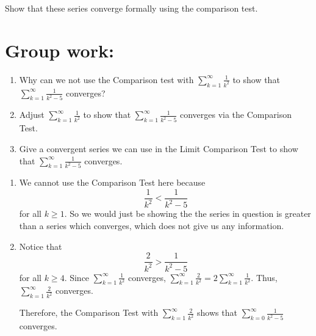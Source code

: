 \documentclass[noinstructornotes]{ximera}
\begin{document}
\begin{instructorNotes}
Show that these series converge formally using the comparison test.
\end{instructorNotes}







\section{Group work:}



\begin{problem}
	\begin{enumerate}
	
	\item  Why can we not use the Comparison test with $\sum_{k=1}^\infty \frac{1}{k^2}$ to show that $\sum_{k=1}^\infty \frac{1}{k^2 - 5}$ converges?
	
	\item  Adjust $\sum_{k=1}^\infty \frac{1}{k^2}$ to show that $\sum_{k=1}^\infty \frac{1}{k^2 - 5}$ converges via the Comparison Test.
	
	\item  Give a convergent series we can use in the Limit Comparison Test to show that $\sum_{k=1}^\infty \frac{1}{k^2 - 5}$ converges.  
	
	\end{enumerate}
	
	\begin{freeResponse}
		\begin{enumerate}
		
		\item  We cannot use the Comparison Test here because 
			\[
			\frac{1}{k^2} < \frac{1}{k^2 - 5}
			\]
		for all $k \geq 1$.  So we would just be showing the the series in question is greater than a series which converges, which does not give us any information.
		
		
		
		\item  Notice that
			\[
			\frac{2}{k^2} > \frac{1}{k^2 - 5}
			\]
		for all $k \geq 4$.  
		Since $\sum_{k=1}^\infty \frac{1}{k^2}$ converges, $\sum_{k=1}^\infty \frac{2}{k^2} = 2 \sum_{k=1}^\infty \frac{1}{k^2}$.  
		Thus, $\sum_{k=1}^\infty \frac{2}{k^2}$ converges.
		
		Therefore, the Comparison Test with $\sum_{k=1}^\infty \frac{2}{k^2}$ shows that $\sum_{k=0}^\infty \frac{1}{k^2-5}$ converges.
		

\end{enumerate}
\end{freeResponse}
\end{problem}
\end{document}
